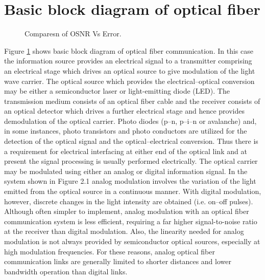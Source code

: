 \documentclass[12pt]{report}
\begin{document}
	\section{Basic block diagram of optical fiber}
	\begin{figure}[htbp]
		\caption{Comparesn of OSNR Vs Error.}
		\label{xyz}
	\end{figure}
	
	Figure \ref{xyz} shows basic block diagram of optical fiber communication. In this case the information source provides an electrical signal to a transmitter comprising an electrical stage which drives an optical source to give modulation of the light wave carrier. The optical source which provides the electrical–optical conversion may be either a semiconductor laser or light-emitting diode (LED). The transmission medium consists of an optical fiber cable and the receiver consists of an optical detector which drives a further electrical stage and hence provides demodulation of the optical carrier. Photo diodes (p–n, p–i–n or avalanche) and, in some instances, photo transistors and photo conductors are utilized for the detection of the optical signal and the optical–electrical conversion. Thus there is a requirement for electrical interfacing at either end of the optical link and at present the signal processing is usually performed electrically. The optical carrier may be modulated using either an analog or digital information signal. In the system shown in Figure 2.1 analog modulation involves the variation of the light emitted from the optical source in a continuous manner. With digital modulation, however, discrete changes in the light intensity are obtained (i.e. on–off pulses). Although often simpler to implement, analog modulation with an optical fiber communication system is less efficient, requiring a far higher signal-to-noise ratio at the receiver than digital modulation. Also, the linearity needed for analog modulation is not always provided by semiconductor optical sources, especially at high modulation frequencies. For these reasons, analog optical fiber communication links are generally limited to shorter distances and lower bandwidth operation than digital links.
\end{document}
